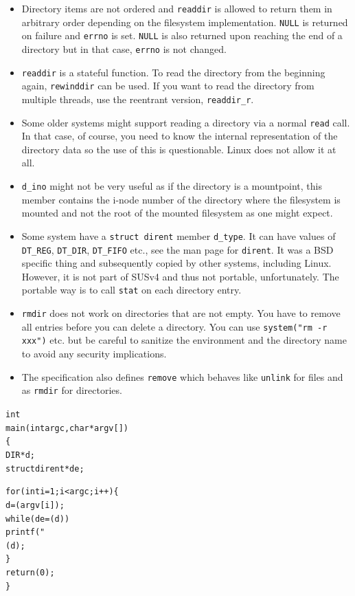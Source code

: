\begin{itemize}
\item Directory items are not ordered and
\texttt{readdir} is allowed to return them in arbitrary order depending on the
filesystem implementation.  \texttt{NULL} is returned on failure
and \texttt{errno} is set.  \texttt{NULL} is also returned upon reaching the end
of a directory but in that case, \texttt{errno} is not changed.
\item \texttt{readdir} is a stateful function.  To read the directory from the
beginning again, \texttt{rewinddir} can be used.  If you want to read the
directory from multiple threads, use the reentrant version, \texttt{readdir\_r}.
\item Some older systems might support reading a directory via a normal
\texttt{read} call.  In that case, of course, you need to know the internal
representation of the directory data so the use of this is questionable.  Linux
does not allow it at all.
\item \texttt{d\_ino} might not be very useful as if the directory is a
mountpoint, this member contains the i-node number of the directory where the
filesystem is mounted and not the root of the mounted filesystem as one might
expect.
\item \label{D_TYPE} Some system have a \texttt{struct dirent} member
\texttt{d\_type}.  It can have values of \texttt{DT\_REG}, \texttt{DT\_DIR},
\texttt{DT\_FIFO} etc., see the man page for \texttt{dirent}.  It was a BSD
specific thing and subsequently copied by other systems, including Linux.
However, it is not part of SUSv4 and thus not portable, unfortunately.
The portable way is to call \texttt{stat} on each directory entry.
\item \texttt{rmdir} does not work on directories that are not empty.  You have
to remove all entries before you can delete a directory.  You can use
\texttt{system("rm -r xxx")} etc. but be careful to sanitize the environment and
the directory name to avoid any security implications.
\item \label{REMOVE} The specification also defines \texttt{remove} which
behaves like \texttt{unlink} for files and as \texttt{rmdir} for directories.
\end{itemize}


\begin{slide}
\begin{alltt}
int
main(int argc, char *argv[])
\{
    DIR *d;
    struct dirent *de;

    for (int i = 1; i < argc; i++) \{
        d = (argv[i]);
        while (de = (d))
            printf("%
        (d);
    \}
    return (0);
\}
\end{alltt}
\end{slide}

